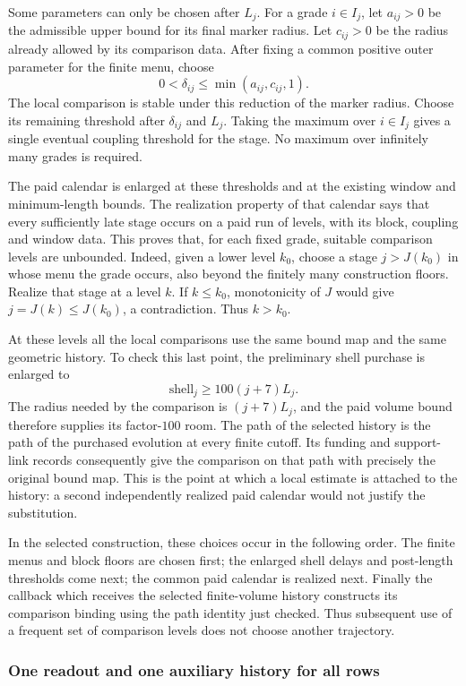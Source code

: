 Some parameters can only be chosen after $L_j$. For a grade $i\in I_j$,
let $a_{ij}>0$ be the admissible upper bound for its final marker radius.
Let $c_{ij}>0$ be the radius already allowed by its comparison data.
After fixing a common positive outer parameter for the finite menu, choose
\[
             0<\delta_{ij}\le\min(a_{ij},c_{ij},1).
\]
The local comparison is stable under this reduction of the marker radius.
Choose its remaining threshold after $\delta_{ij}$ and $L_j$. Taking the
maximum over $i\in I_j$ gives a single eventual coupling threshold for
the stage. No maximum over infinitely many grades is required.

The paid calendar is enlarged at these thresholds and at the existing
window and minimum-length bounds. The realization property of that
calendar says that every sufficiently late stage occurs on a paid run
of levels, with its block, coupling and window data. This proves that,
for each fixed grade, suitable comparison levels are unbounded. Indeed,
given a lower level $k_0$, choose a stage $j>J(k_0)$ in whose menu the
grade occurs, also beyond the finitely many construction floors. Realize
that stage at a level $k$. If $k\le k_0$, monotonicity of $J$ would give
$j=J(k)\le J(k_0)$, a contradiction. Thus $k>k_0$.

At these levels all the local comparisons use the same bound map and
the same geometric history. To check this last point, the preliminary
shell purchase is enlarged to
\[
                     \text{shell}_j\ge100(j+7)L_j.
\]
The radius needed by the comparison is $(j+7)L_j$, and the paid volume
bound therefore supplies its factor-$100$ room. The path of the selected
history is the path of the purchased evolution at every finite cutoff.
Its funding and support-link records consequently give the comparison
on that path with precisely the original bound map. This is the point
at which a local estimate is attached to the history: a second
independently realized paid calendar would not justify the substitution.

In the selected construction, these choices occur in the following
order. The finite menus and block floors are chosen first; the enlarged
shell delays and post-length thresholds come next; the common paid
calendar is realized next. Finally the callback which receives the
selected finite-volume history constructs its comparison binding using
the path identity just checked. Thus subsequent use of a frequent set
of comparison levels does not choose another trajectory.

\subsubsection{One readout and one auxiliary history for all rows}

